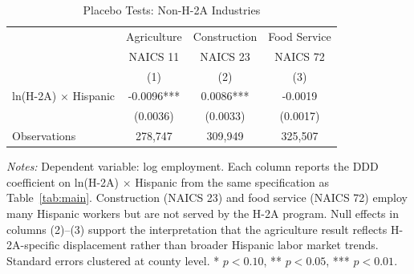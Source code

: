 \begin{table}[htbp]
\centering
\caption{Placebo Tests: Non-H-2A Industries}
\label{tab:placebo}
\small
\begin{tabular}{lccc}
\hline\hline
 & Agriculture & Construction & Food Service \\
 & NAICS 11 & NAICS 23 & NAICS 72 \\
 & (1) & (2) & (3) \\
\hline
ln(H-2A) $\times$ Hispanic & -0.0096*** & 0.0086*** & -0.0019 \\
 & (0.0036) & (0.0033) & (0.0017) \\
Observations & 278,747 & 309,949 & 325,507 \\
\hline\hline
\end{tabular}
\begin{tablenotes}
\item \textit{Notes:} Dependent variable: log employment. Each column reports the DDD coefficient on ln(H-2A) $\times$ Hispanic from the same specification as Table~\ref{tab:main}. Construction (NAICS 23) and food service (NAICS 72) employ many Hispanic workers but are not served by the H-2A program. Null effects in columns (2)--(3) support the interpretation that the agriculture result reflects H-2A-specific displacement rather than broader Hispanic labor market trends. Standard errors clustered at county level. * $p<0.10$, ** $p<0.05$, *** $p<0.01$.
\end{tablenotes}
\end{table}


